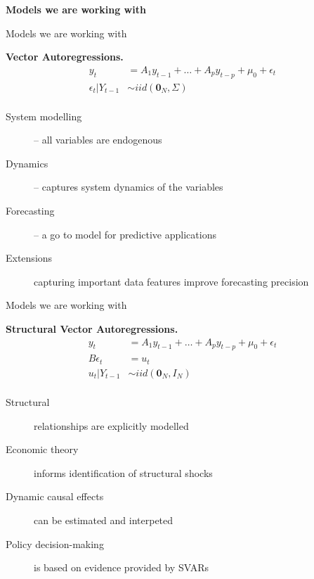 \documentclass[notes,blackandwhite,mathsans]{beamer}
\begin{document}
{
\begin{frame}

\begin{adjustwidth}{-0.5cm}{0cm}
\vspace{8.3cm}\Large
\textbf{{\color{mcxs3}Models } {\color{mcxs1}we are working with}}
\end{adjustwidth}

\end{frame}
}




\begin{frame}{Models we are working with}

\textbf{Vector Autoregressions.}
\begin{align*}
y_t &= A_1 y_{t-1} + \dots + A_p y_{t-p}  + \mu_0 + \epsilon_t\\[1ex]
\epsilon_t|Y_{t-1} &\sim iid\left(\mathbf{0}_N,\Sigma\right)\\
\end{align*}

\begin{description}
\item[System modelling] {\color{mcxs2}-- all variables are endogenous} 
\item[Dynamics] {\color{mcxs2}-- captures system dynamics of the variables} 
\item[Forecasting] {\color{mcxs2}-- a go to model for predictive applications} 
\item[Extensions] {\color{mcxs2} capturing important data features improve forecasting precision}
\end{description}
\end{frame}




\begin{frame}{Models we are working with}

\textbf{Structural Vector Autoregressions.}
\begin{align*}
y_t &= A_1 y_{t-1} + \dots + A_p y_{t-p}  + \mu_0 + \epsilon_t\\[1ex]
B\epsilon_t &= u_t \\[1ex]
u_t|Y_{t-1} &\sim iid\left(\mathbf{0}_N,I_N\right)\\
\end{align*}

\begin{description}
\item[Structural] {\color{mcxs2}relationships are explicitly modelled} 
\item[Economic theory] {\color{mcxs2}informs identification of structural shocks} 
\item[Dynamic causal effects] {\color{mcxs2}can be estimated and interpeted} 
\item[Policy decision-making] {\color{mcxs2}is based on evidence provided by SVARs}
\end{description}
\end{frame}
\end{document}
